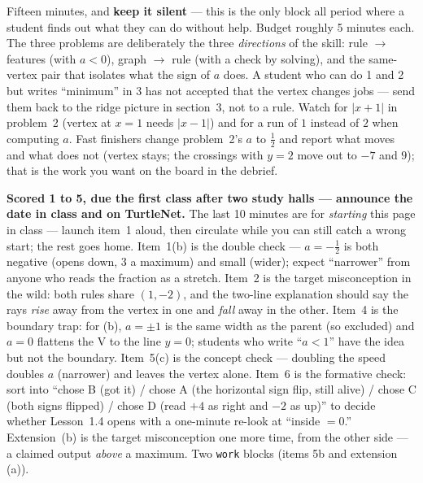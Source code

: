\documentclass[10pt]{article}
\begin{document}
\begin{teachernote}
Fifteen minutes, and \textbf{keep it silent} --- this is the only block all period where a student
finds out what they can do without help. Budget roughly 5 minutes each. The three problems are
deliberately the three \emph{directions} of the skill: rule $\to$ features (with $a<0$), graph
$\to$ rule (with a check by solving), and the same-vertex pair that isolates what the sign of $a$
does. A student who can do 1 and 2 but writes ``minimum'' in 3 has not accepted that the vertex
changes jobs --- send them back to the ridge picture in section~3, not to a rule. Watch for
$|x+1|$ in problem~2 (vertex at $x=1$ needs $|x-1|$) and for a run of $1$ instead of $2$ when
computing $a$. Fast finishers change problem~2's $a$ to $\tfrac12$ and report what moves and what
does not (vertex stays; the crossings with $y=2$ move out to $-7$ and $9$); that is the work you
want on the board in the debrief.
\end{teachernote}

\begin{teachernote}[Homework]
\textbf{Scored 1 to 5, due the first class after two study halls --- announce the date in class and on
TurtleNet.} The last 10 minutes are for \emph{starting} this page in class --- launch item~1 aloud,
then circulate while you can still catch a wrong start; the rest goes home. Item~1(b) is the
double check --- $a=-\tfrac12$ is both negative (opens down, $3$ a maximum) and small (wider);
expect ``narrower'' from anyone who reads the fraction as a stretch. Item~2 is the target
misconception in the wild: both rules share $(1,-2)$, and the two-line explanation should say the
rays \emph{rise} away from the vertex in one and \emph{fall} away in the other. Item~4 is the
boundary trap: for (b), $a=\pm1$ is the same width as the parent (so excluded) and $a=0$ flattens
the V to the line $y=0$; students who write ``$a<1$'' have the idea but not the boundary. Item~5(c)
is the concept check --- doubling the speed doubles $a$ (narrower) and leaves the vertex alone.
Item~6 is the formative check: sort into ``chose B (got it) / chose A (the horizontal sign flip,
still alive) / chose C (both signs flipped) / chose D (read $+4$ as right and $-2$ as up)'' to
decide whether Lesson~1.4 opens with a one-minute re-look at ``inside $=0$.'' Extension~(b) is the
target misconception one more time, from the other side --- a claimed output \emph{above} a
maximum. Two \texttt{work} blocks (items 5b and extension (a)).
\end{teachernote}
\end{document}
